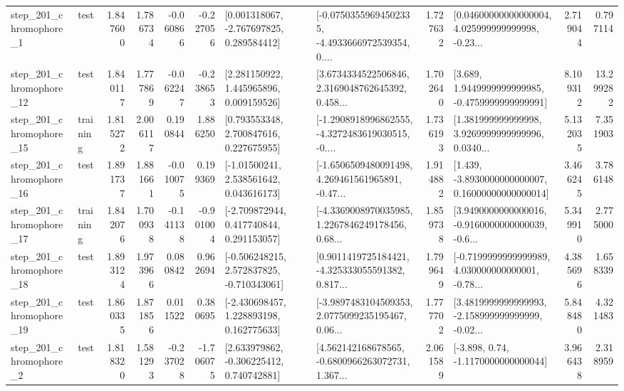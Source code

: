 \begin{tabular}{llrrrrllrlrr}
   step\_201\_chromophore\_1 &      test &      1.847600 &    1.786734 &     -0.060866 & -0.227056 &    [0.001318067, -2.767697825, 0.289584412] &  [-0.07503559694502335, -4.4933666972539354, 0.... &       1.727632 &  [0.04600000000000004, 4.025999999999998, -0.23... &            2.719044 &          0.797114 \\
  step\_201\_chromophore\_12 &      test &      1.840117 &    1.777869 &     -0.062247 & -0.238653 &     [2.281150922, 1.445965896, 0.009159526] &  [3.6734334522506846, 2.3169048762645392, 0.458... &       1.702640 &   [3.689, 1.9449999999999985, -0.4759999999999991] &            8.109312 &         13.299282 \\
  step\_201\_chromophore\_15 &  training &      1.815272 &    2.006117 &      0.190844 &  1.886250 &     [0.793553348, 2.700847616, 0.227675955] &  [-1.2908918996862555, -4.3272483619030515, -0.... &       1.736193 &  [1.381999999999998, 3.9269999999999996, 0.0340... &            5.132035 &          7.351903 \\
  step\_201\_chromophore\_16 &      test &      1.891737 &    1.881661 &     -0.010075 &  0.199369 &     [-1.01500241, 2.538561642, 0.043616173] &  [-1.6506509480091498, 4.269461561965891, -0.47... &       1.914882 &  [1.439, -3.8930000000000007, 0.16000000000000014] &            3.466245 &          3.786148 \\
  step\_201\_chromophore\_17 &  training &      1.842076 &    1.700938 &     -0.141138 & -0.901004 &    [-2.709872944, 0.417740844, 0.291153057] &  [-4.3369008970035985, 1.2267846249178456, 0.68... &       1.859738 &  [3.9490000000000016, -0.9160000000000039, -0.6... &            5.349910 &          2.775000 \\
  step\_201\_chromophore\_18 &      test &      1.893124 &    1.973966 &      0.080842 &  0.962694 &   [-0.506248215, 2.572837825, -0.710343061] &  [0.9011419725184421, -4.325333055591382, 0.817... &       1.799649 &  [-0.7199999999999989, 4.030000000000001, -0.78... &            4.385696 &          1.658339 \\
  step\_201\_chromophore\_19 &      test &      1.860335 &    1.871856 &      0.011522 &  0.380695 &    [-2.430698457, 1.228893198, 0.162775633] &  [-3.9897483104509353, 2.0775099235195467, 0.06... &       1.777702 &  [3.4819999999999993, -2.158999999999999, -0.02... &            5.848480 &          4.321483 \\
   step\_201\_chromophore\_2 &      test &      1.818320 &    1.581293 &     -0.237028 & -1.706075 &    [2.633979862, -0.306225412, 0.740742881] &  [4.562142168678565, -0.6800966263072731, 1.367... &       2.061589 &                [-3.898, 0.74, -1.1170000000000044] &            3.966438 &          2.318959 \\

\end{tabular}
